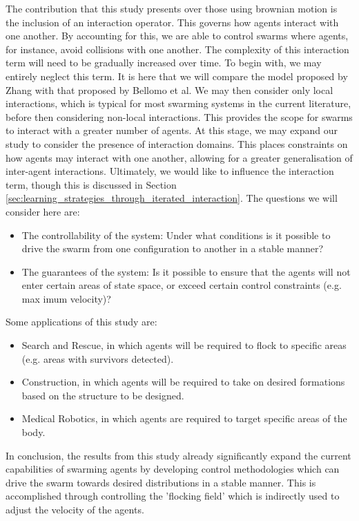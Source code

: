 \documentclass[../sample.tex]{subfiles}
\begin{document}
	The contribution that this study presents over those using brownian motion is the inclusion of an
	interaction operator. This governs how agents interact with one another. By accounting for this, we
	are able to control swarms where agents, for instance, avoid collisions with one another. The
	complexity of this interaction term will need to be gradually increased over time. To begin with,
	we may entirely neglect this term. It is here that we will compare the model proposed by Zhang with
	that proposed by Bellomo et al. We may then consider only local interactions, which is typical for
	most swarming systems in the current literature, before then considering non-local interactions.
	This provides the scope for swarms to interact with a greater number of agents. At this
	stage, we may expand our study to consider the presence of interaction domains. This places
	constraints on how agents may interact with one another, allowing for a greater generalisation of
	inter-agent interactions. Ultimately, we would like to influence the interaction term, though this
	is discussed in Section \ref{sec:learning_strategies_through_iterated_interaction}. The questions
	we will consider here are:

	\begin{itemize}
		\item The controllability of the system: Under what conditions is it possible to drive the
		swarm from one configuration to another in a stable manner?
		\item The guarantees of the system: Is it possible to ensure that the agents will not enter
		certain areas of state space, or exceed certain control constraints (e.g. max imum velocity)?
	\end{itemize}

	Some applications of this study are:

	\begin{itemize}
		\item Search and Rescue, in which agents will be required to flock to specific areas (e.g.
		areas with survivors detected).
		\item Construction, in which agents will be required to take on desired formations based on
		the structure to be designed.
		\item Medical Robotics, in which agents are required to target specific areas of the body.
	\end{itemize}


	In conclusion, the results from this study already significantly expand the current capabilities of
	swarming agents by developing control methodologies which can drive the swarm towards desired
	distributions in a stable manner. This is accomplished through controlling the 'flocking field'
	which is indirectly used to adjust the velocity of the agents.
\end{document}
